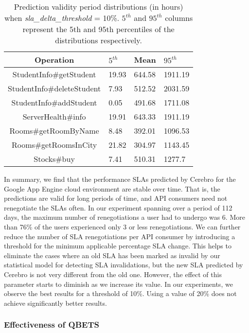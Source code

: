 \begin{table}
\begin{center}
\begin{tabular}{|c|p{2cm}|p{2cm}|p{2cm}|}
\hline
Operation & $5^{th}$ & Mean & $95^{th}$ \\ \hline
StudentInfo\#getStudent & 19.93 & 644.58 & 1911.19 \\ \hline
StudentInfo\#deleteStudent & 7.93 & 512.52 & 2031.59 \\ \hline
StudentInfo\#addStudent & 0.05 & 491.68 & 1711.08 \\ \hline
ServerHealth\#info & 19.91 & 643.33 & 1911.19 \\ \hline
Rooms\#getRoomByName & 8.48 & 392.01 & 1096.53 \\ \hline
Rooms\#getRoomsInCity & 21.82 & 304.97 & 1143.45 \\ \hline
Stocks\#buy & 7.41 & 510.31 & 1277.7 \\ \hline
\end{tabular}
\end{center}
\caption{Prediction validity period distributions (in hours)
when \textit{sla\_delta\_threshold} = 10\%. $5^{th}$ and $95^{th}$ 
columns represent the 5th and 95th percentiles of the
distributions respectively. 
\label{tab:validity_periods_sd10}
}
\end{table}

In summary, we find that the performance SLAs predicted by Cerebro 
for the Google App Engine cloud environment are stable over time. That is, the predictions are 
valid for long periods of time, and API consumers need not renegotiate the SLAs 
often. In our experiment spanning over a period of 112
days, the maximum number of renegotiations a user had to undergo was 6. More than 76\% of
the users experienced only 3 or less renegotiations. We can further reduce the number of 
SLA renegotiations per API consumer by introducing a threshold for the minimum applicable
percentage SLA change. This helps to eliminate the cases where an old SLA has been marked as invalid
by our statistical model for detecting SLA invalidations, but the new SLA predicted by Cerebro is not
very different from the old one. However, the effect of this parameter starts to diminish as we
increase its value. In our experiments, we observe the best results for a threshold of
10\%. Using a value of 20\% does not achieve significantly better results.

\subsubsection{Effectiveness of QBETS}
\label{sec:learning}


